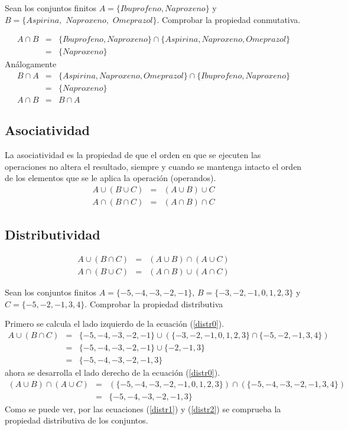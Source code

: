 \begin{myexample}
Sean los conjuntos finitos $A=\{Ibuprofeno,Naproxeno\}$ y \\ $B=\{ Aspirina,$ $Naproxeno,$ $Omeprazol \}$. Comprobar la propiedad conmutativa.
\end{myexample}
\begin{eqnarray*}
A\cap B&=& \{Ibuprofeno,Naproxeno\}\cap\{Aspirina,Naproxeno, Omeprazol \}\nonumber\\
&=& \{ Naproxeno\} \nonumber
\end{eqnarray*}
Análogamente
\begin{eqnarray*}
B\cap A&=&\{Aspirina, Naproxeno, Omeprazol \}\cap\{Ibuprofeno, Naproxeno\}\nonumber\\
&=& \{Naproxeno\}\nonumber\\
A\cap B &=& B\cap A \nonumber
\end{eqnarray*}

\subsection{Asociatividad}
La asociatividad es la propiedad de que el orden en que se ejecuten las operaciones no altera el resultado, siempre y cuando se mantenga intacto el orden de los elementos que se le aplica la operación (operandos).
\begin{eqnarray}
A\cup (B\cup C)&=&(A\cup B)\cup C\\
A\cap (B\cap C)&=&(A\cap B)\cap C
\end{eqnarray}
\subsection{Distributividad}
\begin{eqnarray}
A\cup (B\cap C)&=& (A\cup B)\cap(A\cup C)\label{distr0}\\
A\cap (B\cup C)&=& (A\cap B)\cup(A\cap C)
\end{eqnarray}

\begin{myexample}
Sean los conjuntos finitos $A=\{-5,-4,-3,-2,-1\}$, $B=\{-3,-2,-1,0,1,2,3\}$ y $C=\{-5,-2,-1,3,4\}$. Comprobar la propiedad distributiva
\end{myexample}
Primero se calcula el lado izquierdo de la ecuación (\ref{distr0}).
\begin{eqnarray}
A\cup (B\cap C) &=& \{-5,-4,-3,-2,-1\}\cup(\{-3,-2,-1,0,1,2,3\}\cap\{-5,-2,-1,3,4\}) \nonumber\\
&=& \{-5,-4,-3,-2,-1\}\cup\{-2,-1,3\}\nonumber\\
&=&\{-5,-4,-3,-2,-1,3\}\label{distr1}
\end{eqnarray}
ahora se desarrolla el lado derecho de la ecuación (\ref{distr0}).
\begin{eqnarray}
(A\cup B)\cap(A\cup C)&=&(\{-5,-4,-3,-2,-1,0,1,2,3\})\cap(\{-5,-4,-3,-2,-1,3,4\})\nonumber\\
&=&\{-5,-4,-3,-2,-1,3\}\label{distr2}
\end{eqnarray}
Como se puede ver, por las ecuaciones (\ref{distr1}) y (\ref{distr2}) se comprueba la propiedad distributiva de los conjuntos.

